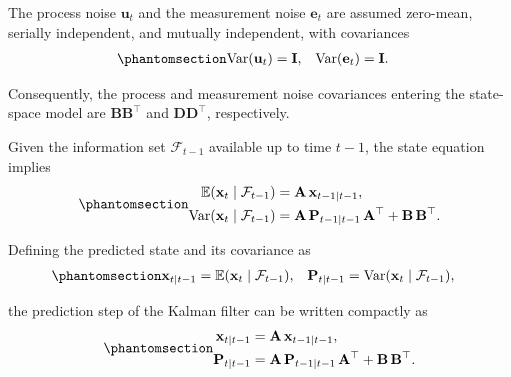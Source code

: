 \documentclass[
  letterpaper,
  DIV=11,
  numbers=noendperiod]{scrreprt}
\begin{document}
The process noise \(\mathbf{u}_t\) and the measurement noise
\(\mathbf{e}_t\) are assumed zero-mean, serially independent, and
mutually independent, with covariances
\begin{equation}\protect\phantomsection\label{eq-gen-0107}{  
\begin{align}
  \operatorname{Var}(\mathbf{u}_t) &= \mathbf{I}, &
  \operatorname{Var}(\mathbf{e}_t) &= \mathbf{I}.
\end{align}
}\end{equation}

Consequently, the process and measurement noise covariances entering the
state-space model are \(\mathbf{B}\mathbf{B}^\top\) and
\(\mathbf{D}\mathbf{D}^\top\), respectively.

Given the information set \(\mathcal{F}_{t-1}\) available up to time
\(t-1\), the state equation implies
\begin{equation}\protect\phantomsection\label{eq-gen-0108}{  
\begin{align}
  \mathbb{E}(\mathbf{x}_t \mid \mathcal{F}_{t-1})
    &= \mathbf{A}\,\mathbf{x}_{t-1\mid t-1}, \\
  \operatorname{Var}(\mathbf{x}_t \mid \mathcal{F}_{t-1})
    &= \mathbf{A}\,\mathbf{P}_{t-1\mid t-1}\,\mathbf{A}^\top
       + \mathbf{B}\,\mathbf{B}^\top.
\end{align}
}\end{equation}

Defining the predicted state and its covariance as
\begin{equation}\protect\phantomsection\label{eq-gen-0109}{  
\begin{align}
  \mathbf{x}_{t\mid t-1} &= \mathbb{E}(\mathbf{x}_t \mid \mathcal{F}_{t-1}), &
  \mathbf{P}_{t\mid t-1} &= \operatorname{Var}(\mathbf{x}_t \mid \mathcal{F}_{t-1}),
\end{align}
}\end{equation}

the prediction step of the Kalman filter can be written compactly as
\begin{equation}\protect\phantomsection\label{eq-KF-Pred}{  
\begin{align}
  \mathbf{x}_{t\mid t-1} &= \mathbf{A}\,\mathbf{x}_{t-1\mid t-1}, \\
  \mathbf{P}_{t\mid t-1} &= \mathbf{A}\,\mathbf{P}_{t-1\mid t-1}\,\mathbf{A}^\top
                           + \mathbf{B}\,\mathbf{B}^\top.
\end{align}
}\end{equation}
\end{document}
